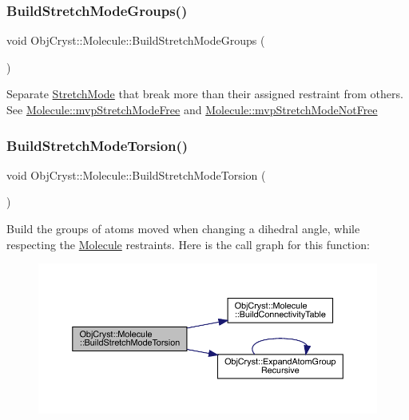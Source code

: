 \subsubsection{\texorpdfstring{BuildStretchModeGroups()}{BuildStretchModeGroups()}}
{\footnotesize\ttfamily void Obj\+Cryst\+::\+Molecule\+::\+Build\+Stretch\+Mode\+Groups (\begin{DoxyParamCaption}{ }\end{DoxyParamCaption})}

Separate \mbox{\hyperlink{struct_obj_cryst_1_1_stretch_mode}{Stretch\+Mode}} that break more than their assigned restraint from others. See \mbox{\hyperlink{class_obj_cryst_1_1_molecule_a215591f48317322bb1b9203ebad4a011}{Molecule\+::mvp\+Stretch\+Mode\+Free}} and \mbox{\hyperlink{class_obj_cryst_1_1_molecule_ae87a1cece989dc3d433eb7fad925c5de}{Molecule\+::mvp\+Stretch\+Mode\+Not\+Free}} \mbox{\label{class_obj_cryst_1_1_molecule_a18d44782b4141dfab334250967d202ad}} 
\subsubsection{\texorpdfstring{BuildStretchModeTorsion()}{BuildStretchModeTorsion()}}
{\footnotesize\ttfamily void Obj\+Cryst\+::\+Molecule\+::\+Build\+Stretch\+Mode\+Torsion (\begin{DoxyParamCaption}{ }\end{DoxyParamCaption})}

Build the groups of atoms moved when changing a dihedral angle, while respecting the \mbox{\hyperlink{class_obj_cryst_1_1_molecule}{Molecule}} restraints. Here is the call graph for this function\+:
\nopagebreak
\begin{figure}[H]
\begin{center}
\leavevmode
\includegraphics[width=350pt]{class_obj_cryst_1_1_molecule_a18d44782b4141dfab334250967d202ad_cgraph}
\end{center}
\end{figure}
\mbox{\label{class_obj_cryst_1_1_molecule_a7f4c6bf6e5be59780cb7844e53711fb3}} 
